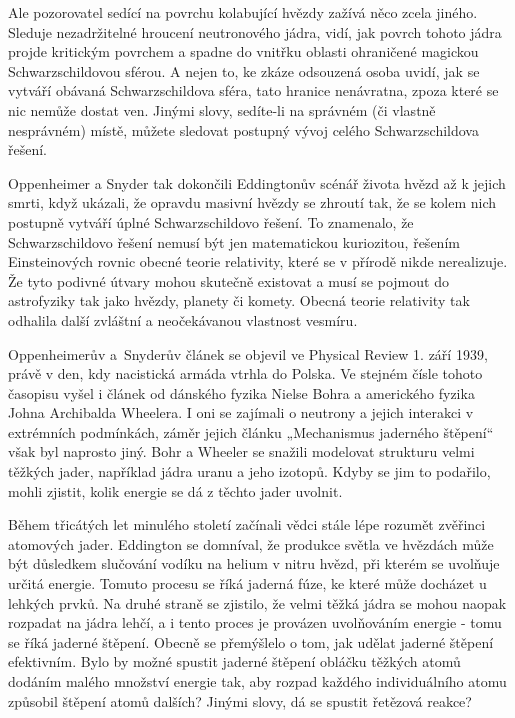  Ale pozorovatel sedící na povrchu kolabující hvězdy zažívá něco zcela jiného. Sleduje
  nezadržitelné hroucení neutronového jádra, vidí, jak povrch tohoto jádra projde kritickým povrchem
  a spadne do vnitřku oblasti ohraničené magickou Schwarzschildovou sférou. A nejen to, ke zkáze
  odsouzená osoba uvidí, jak se vytváří obávaná Schwarzschildova sféra, tato hranice nenávratna,
  zpoza které se nic nemůže dostat ven. Jinými slovy, sedíte-li na správném (či vlastně nesprávném)
  místě, můžete sledovat postupný vývoj celého Schwarzschildova řešení. 
  
  Oppenheimer a Snyder tak dokončili Eddingtonův scénář života hvězd až k jejich smrti, když
  ukázali, že opravdu masivní hvězdy se zhroutí tak, že se kolem nich postupně vytváří úplné
  Schwarzschildovo řešení. To znamenalo, že Schwarzschildovo řešení nemusí být jen matematickou
  kuriozitou, řešením Einsteinových rovnic obecné teorie relativity, které se v přírodě nikde
  nerealizuje. Že tyto podivné útvary mohou skutečně existovat a musí se pojmout do astrofyziky tak
  jako hvězdy, planety či komety. Obecná teorie relativity tak odhalila další zvláštní a
  neočekávanou vlastnost vesmíru. 
  
  Oppenheimerův a Snyderův článek se objevil ve Physical Review 1. září 1939, právě v den, kdy
  nacistická armáda vtrhla do Polska. Ve stejném čísle tohoto časopisu vyšel i článek od dánského
  fyzika Nielse Bohra a amerického fyzika Johna Archibalda Wheelera. I oni se zajímali o neutrony a
  jejich interakci v extrémních podmínkách, záměr jejich článku „Mechanismus jaderného štěpení“ však
  byl naprosto jiný. Bohr a Wheeler se snažili modelovat strukturu velmi těžkých jader, například
  jádra uranu a jeho izotopů. Kdyby se jim to podařilo, mohli zjistit, kolik energie se dá z těchto
  jader uvolnit. 
  
  Během třicátých let minulého století začínali vědci stále lépe rozumět zvěřinci atomových jader.
  Eddington se domníval, že produkce světla ve hvězdách může být důsledkem slučování vodíku na
  helium v nitru hvězd, při kterém se uvolňuje určitá energie. Tomuto procesu se říká jaderná fúze,
  ke které může docházet u lehkých prvků. Na druhé straně se zjistilo, že velmi těžká jádra se mohou
  naopak rozpadat na jádra lehčí, a i tento proces je provázen uvolňováním energie - tomu se říká
  jaderné štěpení. Obecně se přemýšlelo o tom, jak udělat jaderné štěpení efektivním. Bylo by možné
  spustit jaderné štěpení obláčku těžkých atomů dodáním malého množství energie tak, aby rozpad
  každého individuálního atomu způsobil štěpení atomů dalších? Jinými slovy, dá se spustit řetězová
  reakce? 
  
